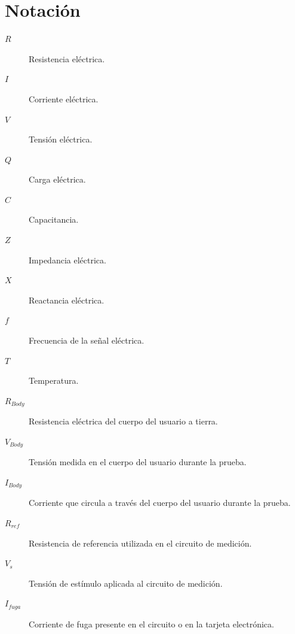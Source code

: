 \chapter*{Notación}

\begin{description}
    \item[$R$] Resistencia eléctrica.
    
    \item[$I$] Corriente eléctrica.
    
    \item[$V$] Tensión eléctrica.
    
    \item[$Q$] Carga eléctrica.
    
    \item[$C$] Capacitancia.
    
    \item[$Z$] Impedancia eléctrica.
    
    \item[$X$] Reactancia eléctrica.
    
    \item[$f$] Frecuencia de la señal eléctrica.
    
    \item[$T$] Temperatura.
    
    \item[$R_{Body}$] Resistencia eléctrica del cuerpo del usuario a tierra.
    
    \item[$V_{Body}$] Tensión medida en el cuerpo del usuario durante la prueba.
    
    \item[$I_{Body}$] Corriente que circula a través del cuerpo del usuario durante la prueba.
    
    \item[$R_{ref}$] Resistencia de referencia utilizada en el circuito de medición.
    
    \item[$V_s$] Tensión de estímulo aplicada al circuito de medición.
    
    \item[$I_{fuga}$] Corriente de fuga presente en el circuito o en la tarjeta electrónica.

\end{description}
